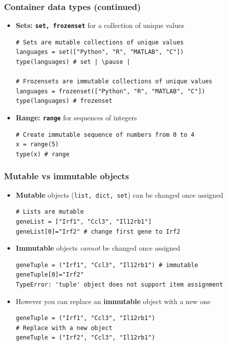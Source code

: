 \documentclass[xcolor=table]{beamer}
\begin{document}
\begin{frame}[fragile]
    \frametitle{Container data types (continued)}

\begin{itemize}\addtolength{\itemsep}{0.5\baselineskip}

\item<1-> \textbf{Sets: \texttt{set, frozenset}} for a collection of unique values
\begin{lstlisting}[style=python]
# Sets are mutable collections of unique values
languages = set(["Python", "R", "MATLAB", "C"])
type(languages) # set | \pause |

# Frozensets are immutable collections of unique values
languages = frozenset(["Python", "R", "MATLAB", "C"])
type(languages) # frozenset
\end{lstlisting}

\item<3-> \textbf{Range: \texttt{range}} for sequences of integers
\begin{lstlisting}[style=python]
# Create immutable sequence of numbers from 0 to 4
x = range(5)
type(x) # range
\end{lstlisting}

\end{itemize}

\end{frame}

\begin{frame}[fragile]
\frametitle{Mutable vs immutable objects}

\begin{itemize}
\item<1-> \textbf{Mutable} objects (\texttt{list, dict, set}) can be changed once assigned
\begin{lstlisting}[style=python]
# Lists are mutable
geneList = ["Irf1", "Ccl3", "Il12rb1"]
geneList[0]="Irf2" # change first gene to Irf2
\end{lstlisting}  

\item<2-> \textbf{Immutable} objects \textit{cannot} be changed once assigned 
\begin{lstlisting}[style=python]
geneTuple = ("Irf1", "Ccl3", "Il12rb1") # immutable
geneTuple[0]="Irf2"
TypeError: 'tuple' object does not support item assignment
\end{lstlisting}  

\item<3-> However you can replace an \textbf{immutable} object with a new one 
\begin{lstlisting}[style=python]
geneTuple = ("Irf1", "Ccl3", "Il12rb1")
# Replace with a new object
geneTuple = ("Irf2", "Ccl3", "Il12rb1")
\end{lstlisting} 

\end{itemize}

\end{frame}
\end{document}
